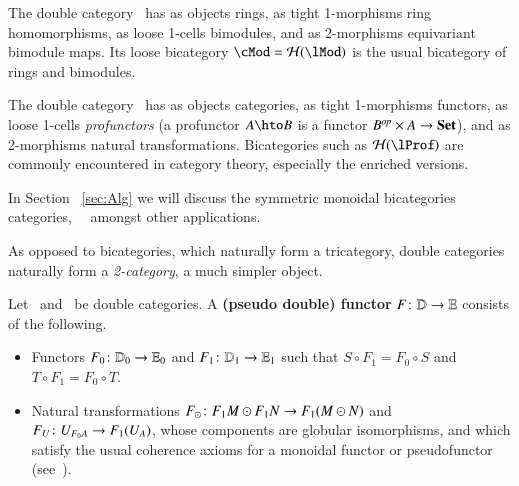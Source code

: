 \begin{eg}
  The double category \lMod\ has as objects rings, as tight 1-morphisms ring
  homomorphisms, as loose 1-cells bimodules, and as 2-morphisms equivariant
  bimodule maps.  Its loose bicategory $\cMod = \cH(\lMod)$ is
  the usual bicategory of rings and bimodules. 
\end{eg}


\begin{eg}
  The double category \lProf\ has as objects categories, as
  tight 1-morphisms functors, as loose 1-cells \emph{profunctors} (a profunctor
  $A\hto B$ is a functor $B^{\mathit{op}}\times A\to \mathbf{Set}$), and as
  2-morphisms natural transformations.  Bicategories such as
  $\cH(\lProf)$ are commonly encountered in category theory,
  especially the enriched versions.
\end{eg}

In Section ~\ref{sec:Alg} we will discuss the symmetric monoidal bicategories categories, \lMod\, \lProf\ amongst other applications.



As opposed to bicategories, which naturally form a tricategory, double
categories naturally form a \emph{2-category}, a much simpler object.

\begin{defn}
  Let \lD\ and \lE\ be double categories.  A \textbf{(pseudo double)
    functor} $F \colon \mathbb{D}\to \mathbb{E}$ consists of the following.
  \begin{itemize}
  \item Functors $F_0\colon \mathbb{D}_0 \to \mathbb{E}_0$ and $F_1\colon \mathbb{D}_1 \to
    \mathbb{E}_1$ such that $S\circ F_1 = F_0\circ S$ and $T\circ F_1 =
    F_0\circ T$.
  \item Natural transformations $F_\odot\colon F_1M \odot F_1N \to
    F_1(M\odot N)$ and $F_U\colon U_{F_0 A} \to F_1(U_A)$, whose
    components are globular isomorphisms, and which satisfy the usual
    coherence axioms for a monoidal functor or pseudofunctor
    (see~\cite[\S{}XI.2]{maclane}).
  \end{itemize}
\end{defn}

